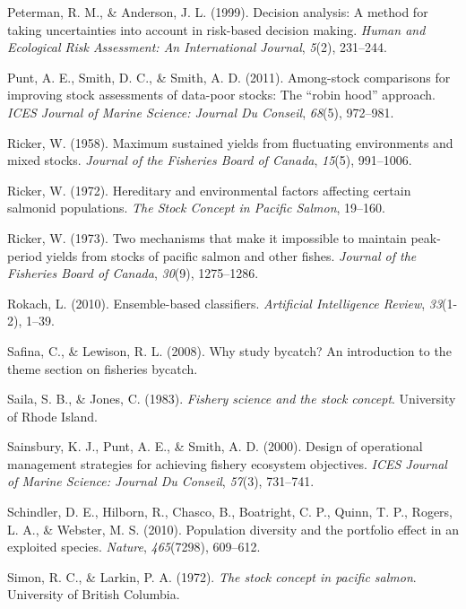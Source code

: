 \documentclass[12pt,]{scrartcl}
\begin{document}
\hypertarget{ref-peterman1999decision}{}
Peterman, R. M., \& Anderson, J. L. (1999). Decision analysis: A method
for taking uncertainties into account in risk-based decision making.
\emph{Human and Ecological Risk Assessment: An International Journal},
\emph{5}(2), 231--244.

\hypertarget{ref-punt2011among}{}
Punt, A. E., Smith, D. C., \& Smith, A. D. (2011). Among-stock
comparisons for improving stock assessments of data-poor stocks: The
``robin hood'' approach. \emph{ICES Journal of Marine Science: Journal
Du Conseil}, \emph{68}(5), 972--981.

\hypertarget{ref-ricker1958maximum}{}
Ricker, W. (1958). Maximum sustained yields from fluctuating
environments and mixed stocks. \emph{Journal of the Fisheries Board of
Canada}, \emph{15}(5), 991--1006.

\hypertarget{ref-ricker1972hereditary}{}
Ricker, W. (1972). Hereditary and environmental factors affecting
certain salmonid populations. \emph{The Stock Concept in Pacific
Salmon}, 19--160.

\hypertarget{ref-ricker1973two}{}
Ricker, W. (1973). Two mechanisms that make it impossible to maintain
peak-period yields from stocks of pacific salmon and other fishes.
\emph{Journal of the Fisheries Board of Canada}, \emph{30}(9),
1275--1286.

\hypertarget{ref-rokach2010ensemble}{}
Rokach, L. (2010). Ensemble-based classifiers. \emph{Artificial
Intelligence Review}, \emph{33}(1-2), 1--39.

\hypertarget{ref-safina2008study}{}
Safina, C., \& Lewison, R. L. (2008). Why study bycatch? An introduction
to the theme section on fisheries bycatch.

\hypertarget{ref-saila1983fishery}{}
Saila, S. B., \& Jones, C. (1983). \emph{Fishery science and the stock
concept}. University of Rhode Island.

\hypertarget{ref-sainsbury2000design}{}
Sainsbury, K. J., Punt, A. E., \& Smith, A. D. (2000). Design of
operational management strategies for achieving fishery ecosystem
objectives. \emph{ICES Journal of Marine Science: Journal Du Conseil},
\emph{57}(3), 731--741.

\hypertarget{ref-schindler2010population}{}
Schindler, D. E., Hilborn, R., Chasco, B., Boatright, C. P., Quinn, T.
P., Rogers, L. A., \& Webster, M. S. (2010). Population diversity and
the portfolio effect in an exploited species. \emph{Nature},
\emph{465}(7298), 609--612.

\hypertarget{ref-simon1972stock}{}
Simon, R. C., \& Larkin, P. A. (1972). \emph{The stock concept in
pacific salmon}. University of British Columbia.
\end{document}
